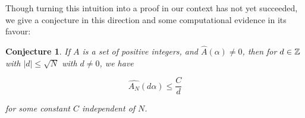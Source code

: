 \documentclass{report}
\newtheorem{conjecture}[theorem]{Conjecture}
\theoremstyle{remark}
\numberwithin{equation}{section}
\begin{document}
Though turning this intuition into a proof in our context has not yet
succeeded, we give a conjecture in this direction and some
computational evidence in its favour: 

\begin{conjecture}\label{conj:decay} 
  If $A$ is a \relevant set of positive integers, and
  $\widehat{A}(\alpha) \neq 0$, then for $d \in \mathbb{Z}$ with $|d| \leq \sqrt{N}$ with $d \neq 0$,
  we have

  \[\widehat{A_N}(d\alpha) \leq \frac{C}{d}\]

  for some constant $C$ independent of $N$.  
\end{conjecture}






\end{document}
